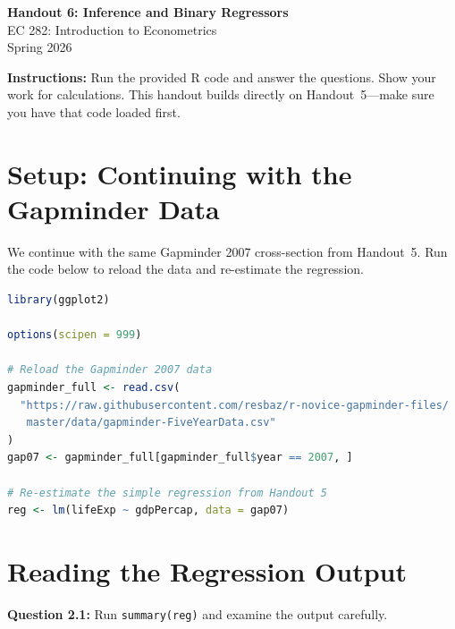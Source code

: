 \documentclass[11pt,letterpaper]{article}
\begin{document}
\begin{center}
{\LARGE\bfseries Handout 6: Inference and Binary Regressors}\\[0.5cm]
{\large EC 282: Introduction to Econometrics}\\[0.3cm]
{\large Spring 2026}
\end{center}

\vspace{0.5cm}

\noindent\textbf{Instructions:} Run the provided R code and answer the questions. Show your work for calculations. This handout builds directly on Handout~5---make sure you have that code loaded first.

\vspace{0.5cm}

\section{Setup: Continuing with the Gapminder Data}

We continue with the same Gapminder 2007 cross-section from Handout~5. Run the code below to reload the data and re-estimate the regression.

\begin{lstlisting}[language=R]
library(ggplot2)

options(scipen = 999)

# Reload the Gapminder 2007 data
gapminder_full <- read.csv(
  "https://raw.githubusercontent.com/resbaz/r-novice-gapminder-files/
   master/data/gapminder-FiveYearData.csv"
)
gap07 <- gapminder_full[gapminder_full$year == 2007, ]

# Re-estimate the simple regression from Handout 5
reg <- lm(lifeExp ~ gdpPercap, data = gap07)
\end{lstlisting}

\section{Reading the Regression Output}

\textbf{Question 2.1:} Run \texttt{summary(reg)} and examine the output carefully.
\end{document}
